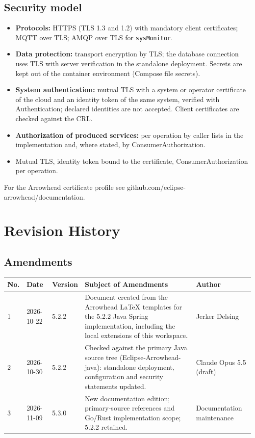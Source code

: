 \documentclass[a4paper]{arrowhead}
\begin{document}
\subsection{Security model}


\begin{itemize}
  \item \textbf{Protocols:} HTTPS (TLS 1.3 and 1.2) with mandatory client certificates; MQTT over TLS; AMQP over TLS for \texttt{sysMonitor}.
  \item \textbf{Data protection:} transport encryption by TLS; the database connection uses TLS with server verification in the standalone deployment. Secrets are kept out of the container environment (Compose file secrets).
  \item \textbf{System authentication:} mutual TLS with a system or operator certificate of the cloud and an identity token of the same system, verified with Authentication; declared identities are not accepted. Client certificates are checked against the CRL.
  \item \textbf{Authorization of produced services:} per operation by caller lists in the implementation and, where stated, by ConsumerAuthorization.
  \item Mutual TLS, identity token bound to the certificate, Consumer\allowbreak{}Authorization per operation.
\end{itemize}

For the Arrowhead certificate profile see github.com/eclipse-arrowhead/documentation.





\newpage

\section{Revision History}
\subsection{Amendments}

\noindent\begin{tabularx}{\textwidth}{| p{1cm} | p{3cm} | p{2cm} | X | p{4cm} |} \hline
\rowcolor{gray!33} No. & Date & Version & Subject of Amendments & Author \\ \hline

1 & 2026-10-22 & 5.2.2 & Document created from the Arrowhead LaTeX templates for the 5.2.2 Java Spring implementation, including the local extensions of this workspace. & Jerker Delsing \\ \hline
2 & 2026-10-30 & 5.2.2 & Checked against the primary Java source tree (Eclipse-Arrowhead-java): standalone deployment, configuration and security statements updated. & Claude Opus 5.5 (draft) \\ \hline
3 & 2026-11-09 & 5.3.0 & New documentation edition; primary-source references and Go/Rust implementation scope; 5.2.2 retained. & Documentation maintenance \\ \hline
\end{tabularx}
\end{document}
